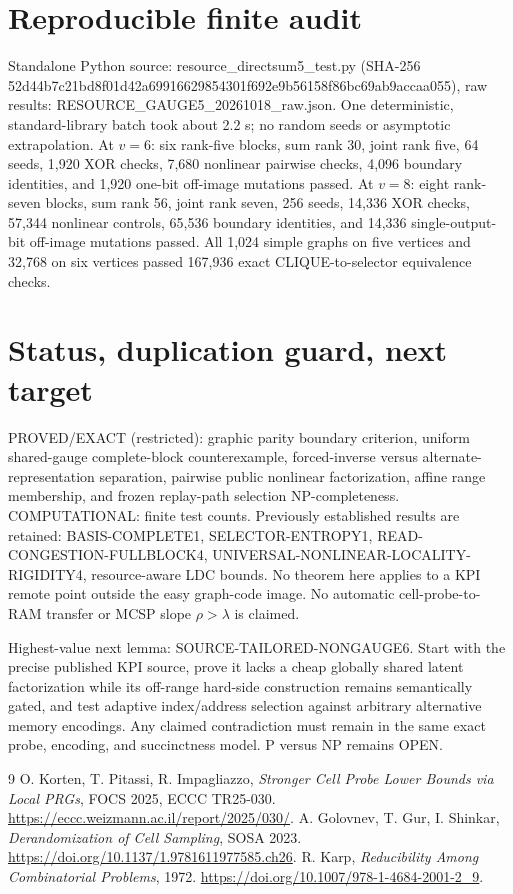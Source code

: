 \documentclass[11pt]{article}
\begin{document}
\section{Reproducible finite audit}
Standalone Python source: resource_directsum5_test.py (SHA-256 52d44b7c21bd8f01d42a69916629854301f692e9b56158f86bc69ab9accaa055), raw results: RESOURCE_GAUGE5_20261018_raw.json. One deterministic, standard-library batch took about 2.2 s; no random seeds or asymptotic extrapolation. At \(v=6\): six rank-five blocks, sum rank 30, joint rank five, 64 seeds, 1,920 XOR checks, 7,680 nonlinear pairwise checks, 4,096 boundary identities, and 1,920 one-bit off-image mutations passed. At \(v=8\): eight rank-seven blocks, sum rank 56, joint rank seven, 256 seeds, 14,336 XOR checks, 57,344 nonlinear controls, 65,536 boundary identities, and 14,336 single-output-bit off-image mutations passed. All 1,024 simple graphs on five vertices and 32,768 on six vertices passed 167,936 exact CLIQUE-to-selector equivalence checks.

\section{Status, duplication guard, next target}
PROVED/EXACT (restricted): graphic parity boundary criterion, uniform shared-gauge complete-block counterexample, forced-inverse versus alternate-representation separation, pairwise public nonlinear factorization, affine range membership, and frozen replay-path selection NP-completeness. COMPUTATIONAL: finite test counts. Previously established results are retained: BASIS-COMPLETE1, SELECTOR-ENTROPY1, READ-CONGESTION-FULLBLOCK4, UNIVERSAL-NONLINEAR-LOCALITY-RIGIDITY4, resource-aware LDC bounds. No theorem here applies to a KPI remote point outside the easy graph-code image. No automatic cell-probe-to-RAM transfer or MCSP slope \(\rho>\lambda\) is claimed.

Highest-value next lemma: SOURCE-TAILORED-NONGAUGE6. Start with the precise published KPI source, prove it lacks a cheap globally shared latent factorization while its off-range hard-side construction remains semantically gated, and test adaptive index/address selection against arbitrary alternative memory encodings. Any claimed contradiction must remain in the same exact probe, encoding, and succinctness model. P versus NP remains OPEN.

\begin{thebibliography}{9}
 O. Korten, T. Pitassi, R. Impagliazzo, \emph{Stronger Cell Probe Lower Bounds via Local PRGs}, FOCS 2025, ECCC TR25-030. \url{https://eccc.weizmann.ac.il/report/2025/030/}.
 A. Golovnev, T. Gur, I. Shinkar, \emph{Derandomization of Cell Sampling}, SOSA 2023. \url{https://doi.org/10.1137/1.9781611977585.ch26}.
 R. Karp, \emph{Reducibility Among Combinatorial Problems}, 1972. \url{https://doi.org/10.1007/978-1-4684-2001-2_9}.
\end{thebibliography}
\end{document}
